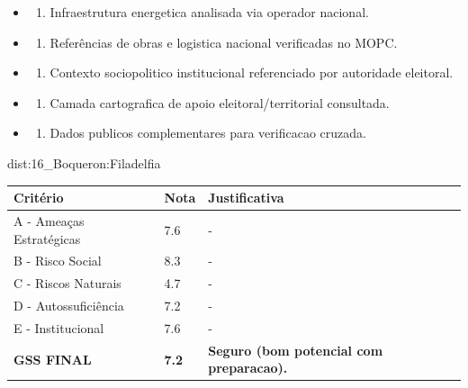 {\begin{itemize}
\item
  \begin{enumerate}
  \def\labelenumi{\arabic{enumi})}
  \setcounter{enumi}{7}
  \tightlist
  \item
    Infraestrutura energetica analisada via operador nacional.
  \end{enumerate}
\item
  \begin{enumerate}
  \def\labelenumi{\arabic{enumi})}
  \setcounter{enumi}{8}
  \tightlist
  \item
    Referências de obras e logistica nacional verificadas no MOPC.
  \end{enumerate}
\item
  \begin{enumerate}
  \def\labelenumi{\arabic{enumi})}
  \setcounter{enumi}{9}
  \tightlist
  \item
    Contexto sociopolitico institucional referenciado por autoridade
    eleitoral.
  \end{enumerate}
\item
  \begin{enumerate}
  \def\labelenumi{\arabic{enumi})}
  \setcounter{enumi}{10}
  \tightlist
  \item
    Camada cartografica de apoio eleitoral/\allowbreak territorial consultada.
  \end{enumerate}
\item
  \begin{enumerate}
  \def\labelenumi{\arabic{enumi})}
  \setcounter{enumi}{11}
  \tightlist
  \item
    Dados publicos complementares para verificacao cruzada.
  \end{enumerate}
\end{itemize}}{dist:16_Boqueron:Filadelfia}
\begin{table}[ht!]
\small \begin{tabular}{p{3.0cm}p{0.8cm}p{6.0cm}} \toprule
\textbf{Critério} & \textbf{Nota} & \textbf{Justificativa} \\ \midrule
A - Ameaças Estratégicas & 7.6 & - \\
B - Risco Social & 8.3 & - \\
C - Riscos Naturais & 4.7 & - \\
D - Autossuficiência & 7.2 & - \\
E - Institucional & 7.6 & - \\
\midrule \textbf{GSS FINAL} & \textbf{7.2} & \textbf{Seguro (bom potencial com preparacao).} \\ \bottomrule \end{tabular}
\end{table}
